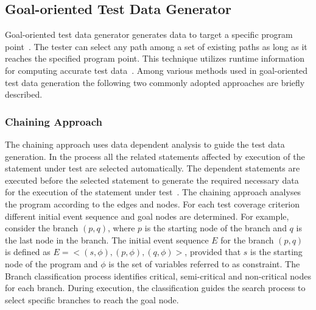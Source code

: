

\subsection{Goal-oriented Test Data Generator}
\label{sec:goaloriented_2}
Goal-oriented test data generator generates data to target a specific program point~\cite{chungautomated}. The tester can select any path among a set of existing paths as long as it reaches the specified program point. This technique utilizes runtime information for computing accurate test data~\cite{ferguson1996chaining}. Among various methods used in goal-oriented test data generation the following two commonly adopted approaches are briefly described.

\subsubsection{Chaining Approach}
The chaining approach uses data dependent analysis to guide the test data generation. In the process all the related statements affected by execution of the statement under test are selected automatically. The dependent statements are executed before the selected statement to generate the required necessary data for the execution of the statement under test~\cite{ferguson1996chaining}. The chaining approach analyses the program according to the edges and nodes. For each test coverage criterion different initial event sequence and goal nodes are determined. For example, consider  the branch $(p, q)$, where $p$ is  the starting node of the branch and $q$ is the last node in the branch. The initial event sequence $E$ for the branch $(p, q)$ is defined as $E =< (s,\phi), (p,\phi),(q,\phi) >$, provided that $s$ is the starting node of the program and $\phi$ is the set of variables referred to as constraint. The Branch classification process identifies critical, semi-critical and non-critical nodes for each branch. During execution, the classification guides the search process to select specific branches to reach the goal node.  

